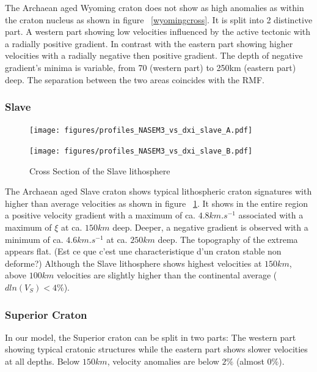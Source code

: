 \documentclass[12pt]{article}
\begin{document}
The Archaean aged Wyoming craton does not show as high anomalies as within the craton nucleus as shown in figure ~\ref{wyomingcross}. 
It is split into 2 distinctive part. A western part showing low velocities influenced by the active tectonic with a radially positive gradient. 
In contrast with the eastern part showing higher velocities with a radially negative then positive gradient. 
The depth of negative gradient's minima is variable, from 70 (western part) to 250km (eastern part) deep. 
The separation between the two areas coincides with the RMF.

\subsubsection{Slave}

	\begin{figure}[h]
		\begin{minipage}{0.5\linewidth}
			\centerline{\texttt{[image: figures/profiles\_NASEM3\_vs\_dxi\_slave\_A.pdf]}}
		\end{minipage}
		\hfill
		\begin{minipage}{0.5\linewidth}
			\centerline{\texttt{[image: figures/profiles\_NASEM3\_vs\_dxi\_slave\_B.pdf]}}
		\end{minipage}

		\caption{Cross Section of the Slave lithosphere}
		\label{slavecross}

	\end{figure}

	The Archaean aged Slave craton shows typical lithospheric craton signatures with higher than average velocities as shown in figure ~\ref{slavecross}. 
	It shows in the entire region a positive velocity gradient with a maximum of ca. $4.8km.s^{-1}$ associated with a maximum of $\xi$ at ca. $150km$ deep.
	Deeper, a negative gradient is observed with a minimum of ca. $4.6km.s^{-1}$ at ca. $250km$ deep. 
	The topography of the extrema appears flat. (Est ce que c'est une characteristique d'un craton stable non deforme?)
	Although the Slave lithosphere shows highest velocities at $150km$, above $100km$ velocities are slightly higher than the continental average ($dln(V_S)< 4\%$).

\subsubsection{Superior Craton}
	In our model, the Superior craton can be split in two parts: The western part showing typical cratonic structures while the eastern part shows slower velocities at all depths. Below $150km$, velocity anomalies are below $2\%$ (almost $0\%$). 
\end{document}
